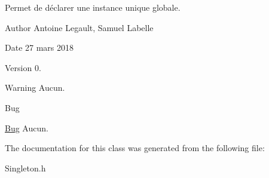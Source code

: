 Permet de déclarer une instance unique globale. \begin{DoxyAuthor}{Author}
Antoine Legault, Samuel Labelle 
\end{DoxyAuthor}
\begin{DoxyDate}{Date}
27 mars 2018 
\end{DoxyDate}
\begin{DoxyVersion}{Version}
0. 
\end{DoxyVersion}
\begin{DoxyWarning}{Warning}
Aucun. 
\end{DoxyWarning}
\begin{DoxyRefDesc}{Bug}
\item[\hyperlink{bug__bug000019}{Bug}]Aucun. \end{DoxyRefDesc}


The documentation for this class was generated from the following file\+:\begin{DoxyCompactItemize}
\item 
Singleton.\+h\end{DoxyCompactItemize}
